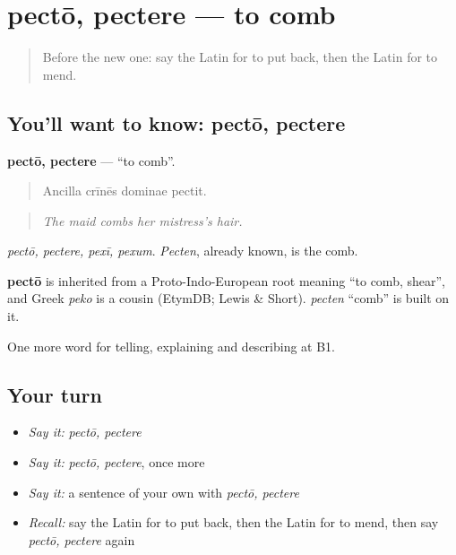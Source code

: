 \section[pectō, pectere]{pectō, pectere — to comb}

\label{lesson:LA-C554-pecto}



\begin{quote}
Before the new one: say the Latin for to put back, then the Latin for to mend.
\end{quote}

\subsection*{You'll want to know: pectō, pectere}
\textbf{pectō, pectere} — \textquotedblleft{}to comb\textquotedblright{}.

\begin{quote}
Ancilla crīnēs dominae pectit.
\end{quote}

\begin{quote}
\emph{The maid combs her mistress's hair.}
\end{quote}

\emph{pectō, pectere, pexī, pexum}. \emph{Pecten}, already known, is the comb.

\begin{cousinweb}
\textbf{pectō} is inherited from a Proto-Indo-European root meaning \textquotedblleft{}to comb, shear\textquotedblright{}, and Greek \emph{peko} is a cousin (EtymDB; Lewis \& Short). \emph{pecten} \textquotedblleft{}comb\textquotedblright{} is built on it.
\end{cousinweb}

\begin{grammarlens}[title={What you've built}]
One more word for telling, explaining and describing at B1.
\end{grammarlens}

\subsection*{Your turn}
\begin{itemize}
\raggedright
  \item \emph{Say it:} \emph{pectō, pectere}
  \item \emph{Say it:} \emph{pectō, pectere}, once more
  \item \emph{Say it:} a sentence of your own with \emph{pectō, pectere}
  \item \emph{Recall:} say the Latin for to put back, then the Latin for to mend, then say \emph{pectō, pectere} again
\end{itemize}


